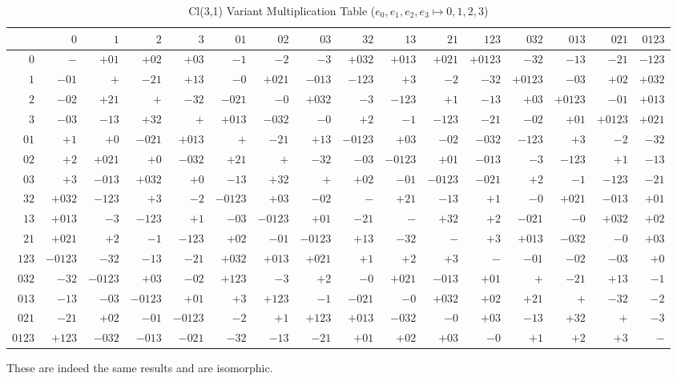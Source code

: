\documentclass[a4paper]{article}
\begin{document}
\begin{table}[ht]
  \begin{center}
    \caption{Cl(3,1) Variant Multiplication Table ($e_0, e_1, e_2, e_3 \mapsto 0,1,2,3$)}
    \scriptsize
    \begin{tabular}{r|rrrrrrrrrrrrrrr}
      &$0$&$1$&$2$&$3$&$01$&$02$&$03$&$32$&$13$&$21$&$123$&$032$&$013$&$021$&$0123$\\\hline
      $0$&$-$&$+01$&$+02$&$+03$&$-1$&$-2$&$-3$&$+032$&$+013$&$+021$&$+0123$&$-32$&$-13$&$-21$&$-123$\\
      $1$&$-01$&$+$&$-21$&$+13$&$-0$&$+021$&$-013$&$-123$&$+3$&$-2$&$-32$&$+0123$&$-03$&$+02$&$+032$\\
      $2$&$-02$&$+21$&$+$&$-32$&$-021$&$-0$&$+032$&$-3$&$-123$&$+1$&$-13$&$+03$&$+0123$&$-01$&$+013$\\
      $3$&$-03$&$-13$&$+32$&$+$&$+013$&$-032$&$-0$&$+2$&$-1$&$-123$&$-21$&$-02$&$+01$&$+0123$&$+021$\\
      $01$&$+1$&$+0$&$-021$&$+013$&$+$&$-21$&$+13$&$-0123$&$+03$&$-02$&$-032$&$-123$&$+3$&$-2$&$-32$\\
      $02$&$+2$&$+021$&$+0$&$-032$&$+21$&$+$&$-32$&$-03$&$-0123$&$+01$&$-013$&$-3$&$-123$&$+1$&$-13$\\
      $03$&$+3$&$-013$&$+032$&$+0$&$-13$&$+32$&$+$&$+02$&$-01$&$-0123$&$-021$&$+2$&$-1$&$-123$&$-21$\\
      $32$&$+032$&$-123$&$+3$&$-2$&$-0123$&$+03$&$-02$&$-$&$+21$&$-13$&$+1$&$-0$&$+021$&$-013$&$+01$\\
      $13$&$+013$&$-3$&$-123$&$+1$&$-03$&$-0123$&$+01$&$-21$&$-$&$+32$&$+2$&$-021$&$-0$&$+032$&$+02$\\
      $21$&$+021$&$+2$&$-1$&$-123$&$+02$&$-01$&$-0123$&$+13$&$-32$&$-$&$+3$&$+013$&$-032$&$-0$&$+03$\\
      $123$&$-0123$&$-32$&$-13$&$-21$&$+032$&$+013$&$+021$&$+1$&$+2$&$+3$&$-$&$-01$&$-02$&$-03$&$+0$\\
      $032$&$-32$&$-0123$&$+03$&$-02$&$+123$&$-3$&$+2$&$-0$&$+021$&$-013$&$+01$&$+$&$-21$&$+13$&$-1$\\
      $013$&$-13$&$-03$&$-0123$&$+01$&$+3$&$+123$&$-1$&$-021$&$-0$&$+032$&$+02$&$+21$&$+$&$-32$&$-2$\\
      $021$&$-21$&$+02$&$-01$&$-0123$&$-2$&$+1$&$+123$&$+013$&$-032$&$-0$&$+03$&$-13$&$+32$&$+$&$-3$\\
      $0123$&$+123$&$-032$&$-013$&$-021$&$-32$&$-13$&$-21$&$+01$&$+02$&$+03$&$-0$&$+1$&$+2$&$+3$&$-$\\
    \end{tabular}
  \end{center}
\end{table}
These are indeed the same results and are isomorphic.
\end{document}
